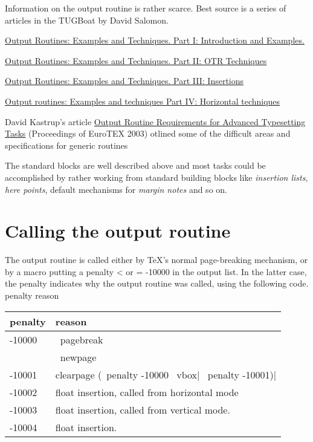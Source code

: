 Information on the output routine is rather scarce. Best source is a series of  articles in the TUGBoat by David Salomon.

\href{http://www.tug.org/TUGboat/Articles/tb11-1/tb27salomon.pdf}{Output Routines: Examples and Techniques. Part I: Introduction and Examples.}

\href{http://www.tug.org/TUGboat/Articles/tb11-2/tb28salomon.pdf}{Output Routines: Examples and Techniques. Part II: OTR Techniques}

\href{http://www.tug.org/TUGboat/Articles/tb11-4/tb30salomon.pdf}{Output Routines: Examples and Techniques. 
Part III: Insertions}

\href{http://www.tug.org/TUGboat/Articles/tb15-1/tb42salomon-output.pdf}{Output routines: Examples and techniques Part IV: Horizontal techniques}


David Kastrup's article \href{http://www.tug.org/TUGboat/Articles/tb24-3/kastrup.pdf}{Output Routine Requirements for Advanced Typesetting Tasks} (Proceedings of EuroTEX 2003) otlined some of the difficult areas and specifications for generic routines

The standard blocks are well described above and most tasks could be accomplished 
by rather working from
standard building blocks like \textit{insertion lists}, \textit{here points},
default mechanisms for \textit{margin notes} and so on.


\section*{Calling the output routine}

The output routine is called either by TeX's normal page-breaking
mechanism, or by a macro putting a penalty < or = -10000 in the output
list. In the latter case, the penalty indicates why the output
routine was called, using the following code.
penalty reason

\begin{tabular}{ll}
\toprule
penalty &reason\\
\midrule
-10000  &\ pagebreak\\
~       &\ newpage\\
-10001  &clearpage (\ penalty -10000 \ vbox{}| \ penalty -10001)|\\
-10002  &float insertion, called from horizontal mode\\
-10003 &float insertion, called from vertical mode.\\
-10004 &float insertion.\\
\bottomrule
\end{tabular}
\medskip

